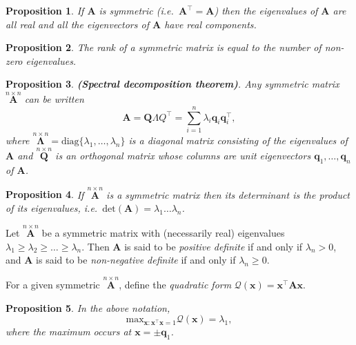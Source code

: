 \documentclass[]{book}
\newtheorem{proposition}{Proposition}[chapter]
\theoremstyle{definition}
\theoremstyle{definition}
\theoremstyle{definition}
\theoremstyle{remark}
\begin{document}
\begin{proposition}
\protect\hypertarget{prp:unnamed-chunk-3}{}{\label{prp:unnamed-chunk-3} }If \(\mathbf A\) is symmetric (i.e.~\({\mathbf A}^\top ={\mathbf A}\)) then the
eigenvalues of \(\mathbf A\) are all \emph{real} and all the eigenvectors of \(\mathbf A\) have
\emph{real} components.
\end{proposition}

\begin{proposition}
\protect\hypertarget{prp:unnamed-chunk-4}{}{\label{prp:unnamed-chunk-4} }The rank of a symmetric matrix is equal to the number of non-zero eigenvalues.
\end{proposition}

\begin{proposition}
\protect\hypertarget{prp:spectraldecomp}{}{\label{prp:spectraldecomp} }\textbf{(Spectral decomposition theorem)}. Any symmetric matrix \(\stackrel{n\times n}{\mathbf A}\) can
be written
\[ {\mathbf A}={\mathbf Q \Lambda Q}^\top = \sum _{i=1}^{n} \lambda _i {\mathbf q}_i {\mathbf q}_i^\top ,\]
where \(\stackrel{n\times n}{\mathbf \Lambda}=\text{diag}\{ \lambda _1, \dots , \lambda _n \}\) is
a diagonal matrix consisting of the eigenvalues of \(\mathbf A\) and \(\stackrel{n\times n}{\mathbf Q}\) is
an orthogonal matrix whose columns are unit eigenvectors
\({\mathbf q}_1, \dots , {\mathbf q}_n\) of \(\mathbf A\).
\end{proposition}

\begin{proposition}
\protect\hypertarget{prp:unnamed-chunk-5}{}{\label{prp:unnamed-chunk-5} }If \(\stackrel{n\times n}{\mathbf A}\) is a symmetric matrix
then its determinant is the product of its eigenvalues, i.e.~\(\text{det}({\mathbf A})=\lambda _1 \dots \lambda _n\).
\end{proposition}

Let \(\stackrel{n\times n}{\mathbf A}\) be a symmetric matrix
with (necessarily real) eigenvalues \(\lambda _1 \geq \lambda _2 \geq \dots \geq \lambda _n\). Then \(\mathbf A\) is said to be \emph{positive definite}
if and only if \(\lambda _n >0\), and \(\boldsymbol A\) is said to be \emph{non-negative definite} if and only if \(\lambda _n\geq 0\).

For a given symmetric \(\stackrel{n\times n}{\mathbf A}\), define the
\emph{quadratic form}
\(\mathcal{Q}({\mathbf x})={\mathbf x}^\top {\mathbf A} {\mathbf x}\).

\begin{proposition}
\protect\hypertarget{prp:two8}{}{\label{prp:two8} }In the above notation,
\[\displaystyle{\text{max}_{{\mathbf x}:{\mathbf x}^\top {\mathbf x}=1}} \mathcal{Q}({\mathbf x})=\lambda_1, \]
where the maximum occurs at \(\boldsymbol x=\pm \boldsymbol q_1\).
\end{proposition}
\end{document}
